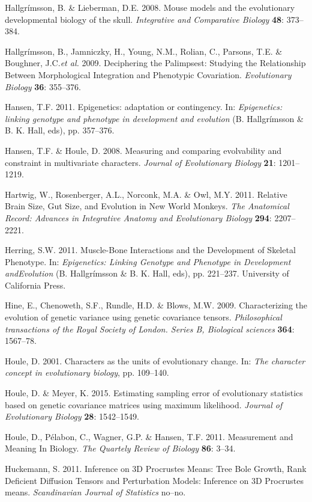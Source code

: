\documentclass[12pt,twoside]{report}
\begin{document}
Hallgrímsson, B. \& Lieberman, D.E. 2008. Mouse models and the
evolutionary developmental biology of the skull. \emph{Integrative and
Comparative Biology} \textbf{48}: 373--384.

Hallgrímsson, B., Jamniczky, H., Young, N.M., Rolian, C., Parsons, T.E.
\& Boughner, J.C.\emph{et al.} 2009. Deciphering the Palimpsest:
Studying the Relationship Between Morphological Integration and
Phenotypic Covariation. \emph{Evolutionary Biology} \textbf{36}:
355--376.

Hansen, T.F. 2011. Epigenetics: adaptation or contingency. In:
\emph{Epigenetics: linking genotype and phenotype in development and
evolution} (B. Hallgrímsson \& B. K. Hall, eds), pp. 357--376.

Hansen, T.F. \& Houle, D. 2008. Measuring and comparing evolvability and
constraint in multivariate characters. \emph{Journal of Evolutionary
Biology} \textbf{21}: 1201--1219.

Hartwig, W., Rosenberger, A.L., Norconk, M.A. \& Owl, M.Y. 2011.
Relative Brain Size, Gut Size, and Evolution in New World Monkeys.
\emph{The Anatomical Record: Advances in Integrative Anatomy and
Evolutionary Biology} \textbf{294}: 2207--2221.

Herring, S.W. 2011. Muscle-Bone Interactions and the Development of
Skeletal Phenotype. In: \emph{Epigenetics: Linking Genotype and
Phenotype in Development andEvolution} (B. Hallgrímsson \& B. K. Hall,
eds), pp. 221--237. University of California Press.

Hine, E., Chenoweth, S.F., Rundle, H.D. \& Blows, M.W. 2009.
Characterizing the evolution of genetic variance using genetic
covariance tensors. \emph{Philosophical transactions of the Royal
Society of London. Series B, Biological sciences} \textbf{364}:
1567--78.

Houle, D. 2001. Characters as the units of evolutionary change. In:
\emph{The character concept in evolutionary biology}, pp. 109--140.

Houle, D. \& Meyer, K. 2015. Estimating sampling error of evolutionary
statistics based on genetic covariance matrices using maximum
likelihood. \emph{Journal of Evolutionary Biology} \textbf{28}:
1542--1549.

Houle, D., Pélabon, C., Wagner, G.P. \& Hansen, T.F. 2011. Measurement
and Meaning In Biology. \emph{The Quartely Review of Biology}
\textbf{86}: 3--34.

Huckemann, S. 2011. Inference on 3D Procrustes Means: Tree Bole Growth,
Rank Deficient Diffusion Tensors and Perturbation Models: Inference on
3D Procrustes means. \emph{Scandinavian Journal of Statistics} no--no.
\end{document}
